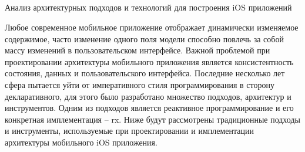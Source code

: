\subsection{} Анализ архитектурных подходов и технологий для построения iOS приложений
\label{sec:analysis:research:mobArch}

Любое современное мобильное приложение отображает динамически изменяемое содержимое, часто изменение одного поля модели способно повлечь за собой массу изменений в пользовательском интерфейсе. Важной проблемой при проектировании архитектуры мобильного приложения является консистентность состояния, данных и пользовательского интерфейса. Последние несколько лет сфера пытается уйти от императивного стиля программирования в сторону декларативного, для этого было разработано множество подходов, архитектур и инструментов. Одним из подходов является реактивное программирование и его конкретная имплементация -- \gls{rx}. Ниже будут рассмотрены традиционные подходы и инструменты, используемые при проектировании и имплементации архитектуры мобильного iOS приложения.








